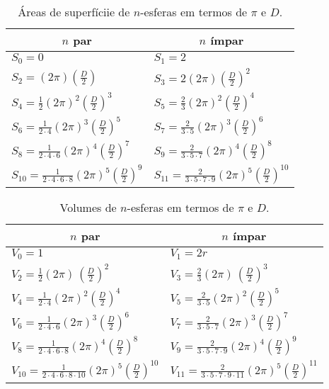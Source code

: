 \begin{table}
\begin{center}
\begin{tabular}{l|l}
\multicolumn{1}{c}{$n$ par} & \multicolumn{1}{c}{$n$ ímpar} \\ \hline
$S_0 = 0$ & $S_1 = 2$ \smallskip \\ 
$S_2 = (2\pi)\left(\frac{D}{2}\right)$ & $S_3 = 2(2\pi)\left(\frac{D}{2}\right)^2$ \smallskip \\ 
$S_4 = \frac{1}{2}(2\pi)^2 \left(\frac{D}{2}\right)^3$ & $S_5 = \frac{2}{3} (2\pi)^2 \left(\frac{D}{2}\right)^4$ \smallskip \\ 
$S_6 = \frac{1}{2\cdot 4}(2\pi)^3 \left(\frac{D}{2}\right)^5$ & $S_7 = \frac{2}{3\cdot 5} (2\pi)^3 \left(\frac{D}{2}\right)^6$ \smallskip \\ 
$S_8 = \frac{1}{2\cdot 4\cdot 6}(2\pi)^4 \left(\frac{D}{2}\right)^7$ & $S_9 = \frac{2}{3\cdot 5\cdot 7} (2\pi)^4 \left(\frac{D}{2}\right)^8$ \smallskip \\ 
$S_{10} = \frac{1}{2\cdot 4\cdot 6\cdot 8}(2\pi)^5 \left(\frac{D}{2}\right)^9$ & $S_{11} = \frac{2}{3\cdot 5\cdot 7\cdot 9} (2\pi)^5 \left(\frac{D}{2}\right)^{10}$ 
\end{tabular}
\end{center}
\caption{Áreas de superfíciie de $n$-esferas em termos de $\pi$ e $D$.\label{table:alternate_circle_constant}}
\end{table}

\begin{table}
\begin{center}
\begin{tabular}{l|l}
\multicolumn{1}{c}{$n$ par} & \multicolumn{1}{c}{$n$ ímpar} \\ \hline
 $V_0 = 1$ & $V_1 = 2r$ \smallskip \\ 
 $V_2 = \frac{1}{2}(2\pi)\,\left(\frac{D}{2}\right)^2$ & $V_3 = \frac{2}{3} (2\pi)\,\left(\frac{D}{2}\right)^3$ \smallskip \\ 
 $V_4 = \frac{1}{2\cdot 4}(2\pi)^2 \left(\frac{D}{2}\right)^4$ & $V_5 =\frac{2}{3\cdot 5} (2\pi)^2 \left(\frac{D}{2}\right)^5$ \smallskip \\ 
 $V_6 =\frac{1}{2\cdot 4\cdot 6}(2\pi)^3 \left(\frac{D}{2}\right)^6$ & $V_7 = \frac{2}{3\cdot 5\cdot 7} (2\pi)^3 \left(\frac{D}{2}\right)^7$ \smallskip \\ 
 $V_8 = \frac{1}{2\cdot 4\cdot 6\cdot 8}(2\pi)^4 \left(\frac{D}{2}\right)^8$ & $V_9 = \frac{2}{3\cdot 5\cdot 7\cdot 9} (2\pi)^4 \left(\frac{D}{2}\right)^9$ \smallskip \\ 
 $V_{10} = \frac{1}{2\cdot 4\cdot 6\cdot 8\cdot 10}(2\pi)^5 \left(\frac{D}{2}\right)^{10}$ & $V_{11} = \frac{2}{3\cdot 5\cdot 7\cdot 9\cdot 11} (2\pi)^5 \left(\frac{D}{2}\right)^{11}$ 
\end{tabular}
\end{center}
\caption{Volumes de $n$-esferas em termos de $\pi$ e $D$.\label{table:alternate_circle_constant}}
\end{table}
